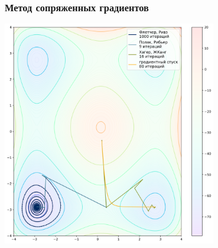 \documentclass[9pt]{beamer}
\begin{document}
\begin{frame}
    \frametitle{Метод сопряженных градиентов}
    \begin{center}
        \includegraphics[width=0.7\textwidth]{grad_3.png}    
    \end{center}
\end{frame}
\end{document}
